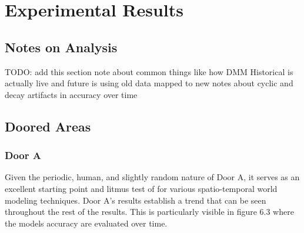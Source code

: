 

\chapter{Experimental Results}

\section{ Notes on Analysis }
TODO: add this section\?
note about common things like how DMM Historical is actually live and future is using old data mapped to new
notes about cyclic and decay artifacts in accuracy over time

\section{ Doored Areas }

\subsection { Door A }

Given the periodic, human, and slightly random nature of Door A, it serves as
an excellent starting point and litmus test of for various spatio-temporal
world modeling techniques. Door A's results establish a trend that can be seen
throughout the rest of the results. This is particularly visible in figure 6.3
where the models accuracy are evaluated over time. \\

\begin{table}[h!]
  \centering
  \caption{Door A Data Overview}
\end{table}


